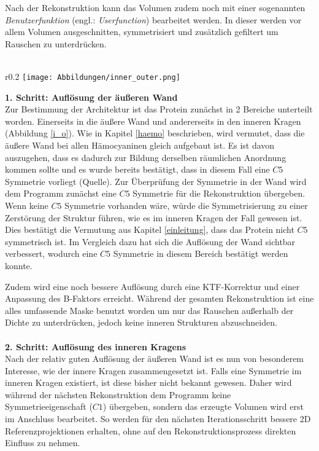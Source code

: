 Nach der Rekonstruktion kann das Volumen zudem noch mit einer sogenannten \textit{Benutzerfunktion} (engl.: \textit{Userfunction}) bearbeitet werden. In dieser werden vor allem Volumen ausgeschnitten, symmetrisiert und zusätzlich gefiltert um Rauschen zu unterdrücken.
\\
\\
\begin{wrapfigure}{r}{0.2\textwidth}
	\centering
	\texttt{[image: Abbildungen/inner\_outer.png]}
	\caption[Trennung des Proteins in zwei Bereiche]{Orange: Innerer Kragen; Blau: Äußere Wand}
	\label{i_o}
\end{wrapfigure}
\textbf{1. Schritt: Auflösung der äußeren Wand}\\
Zur Bestimmung der Architektur ist das Protein zunächst in 2 Bereiche unterteilt worden.
Einerseits in die äußere Wand und andererseits in den inneren Kragen (Abbildung \ref{i_o}).
Wie in Kapitel \ref{haemo} beschrieben, wird vermutet, dass die äußere Wand bei allen Hämocyaninen gleich aufgebaut ist.
Es ist davon auszugehen, dass es dadurch zur Bildung derselben räumlichen Anordnung kommen sollte und es wurde bereits bestätigt, dass in diesem Fall eine $C5$ Symmetrie vorliegt (Quelle).
Zur Überprüfung der Symmetrie in der Wand wird dem Programm zunächst eine $C5$ Symmetrie für die Rekonstruktion übergeben.
Wenn keine $C5$ Symmetrie vorhanden wäre, würde die Symmetrisierung zu einer Zerstörung der Struktur führen, wie es im inneren Kragen der Fall gewesen ist.
Dies bestätigt die Vermutung aus Kapitel \ref{einleitung}, dass das Protein nicht $C5$ symmetrisch ist.
Im Vergleich dazu hat sich die Auflösung der Wand sichtbar verbessert, wodurch eine $C5$ Symmetrie in diesem Bereich bestätigt werden konnte.

Zudem wird eine noch bessere Auflösung durch eine KTF-Korrektur und einer Anpassung des B-Faktors erreicht.
Während der gesamten Rekonstruktion ist eine alles umfassende Maske benutzt worden um nur das Rauschen außerhalb der Dichte zu unterdrücken, jedoch keine inneren Strukturen abzuschneiden.
\\
\\
\textbf{2. Schritt: Auflösung des inneren Kragens}\\
Nach der relativ guten Auflösung der äußeren Wand ist es nun von besonderem Interesse, wie der innere Kragen zusammengesetzt ist.
Falls eine Symmetrie im inneren Kragen existiert, ist diese bisher nicht bekannt gewesen.
Daher wird während der nächsten Rekonstruktion dem Programm keine Symmetrieeigenschaft ($C1$) übergeben, sondern das erzeugte Volumen wird erst im Anschluss bearbeitet.
So werden für den nächsten Iterationsschritt bessere 2D Referenzprojektionen erhalten, ohne auf den Rekonstruktionsprozess direkten Einfluss zu nehmen.

